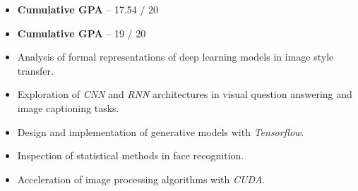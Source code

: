 \documentclass[10pt,a4paper]{altacv}
\begin{document}

\begin{fullwidth}
\makecvheader
\end{fullwidth}


\begin{itemize}
	\item \textbf{Cumulative GPA} -- 17.54 / 20
\end{itemize}


\divider

\begin{itemize}
	\item \textbf{Cumulative GPA} -- 19 / 20
\end{itemize}


\begin{itemize}
\item Analysis of formal representations of deep learning models in image style transfer.
\item Exploration of \textit{CNN} and \textit{RNN} architectures in visual question answering and image captioning tasks.
\item Design and implementation of generative models with \textit{Tensorflow}.
\item Inspection of statistical methods in face recognition.
\item Acceleration of image processing algorithms with \textit{CUDA}.
\end{itemize}
\end{document}
